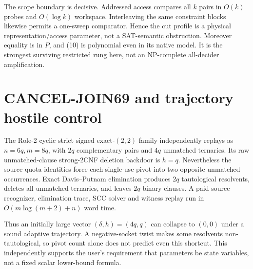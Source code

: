 \documentclass[11pt]{article}
\begin{document}
The scope boundary is decisive.  Addressed access compares all $k$ pairs in
$O(k)$ probes and $O(\log k)$ workspace.  Interleaving the same constraint
blocks likewise permits a one-sweep comparator.  Hence the cut profile is a
physical representation/access parameter, not a SAT-semantic obstruction.
Moreover equality is in $P$, and (10) is polynomial even in its native model.
It is the strongest surviving restricted rung here, not an NP-complete
all-decider amplification.

\section{CANCEL-JOIN69 and trajectory hostile control}
The Role-2 cyclic strict signed exact-$(2,2)$ family independently replays as
$n=6q,m=8q$, with $2q$ complementary pairs and $4q$ unmatched ternaries.
Its raw unmatched-clause strong-2CNF deletion backdoor is $h=q$.  Nevertheless
the source quota identities force each single-use pivot into two opposite
unmatched occurrences.  Exact Davis--Putnam elimination produces $2q$
tautological resolvents, deletes all unmatched ternaries, and leaves $2q$
binary clauses.  A paid source recognizer, elimination trace, SCC solver and
witness replay run in $O(m\log(m+2)+n)$ word time.

Thus an initially large vector $(\delta,h)=(4q,q)$ can collapse to $(0,0)$
under a sound adaptive trajectory.  A negative-socket twist makes some
resolvents non-tautological, so pivot count alone does not predict even this
shortcut.  This independently supports the user's requirement that parameters
be state variables, not a fixed scalar lower-bound formula.
\end{document}

